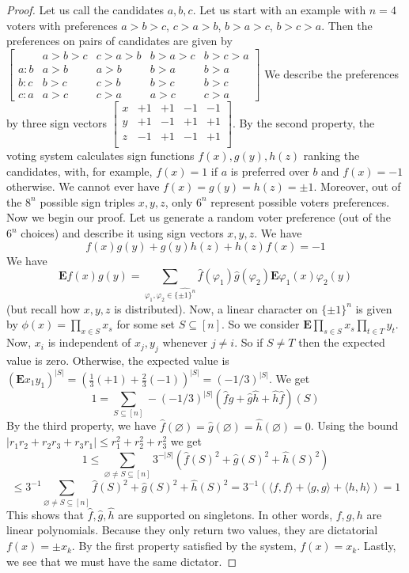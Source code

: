 \documentclass[12pt]{article}
\newcommand{\abs}[1]{\left\lvert#1\right\rvert}
\newcommand{\gen}[1]{\langle#1\rangle}
\newcommand{\vphi}{\varphi}
\newcommand{\E}{\mathbf{E}}
\begin{document}
\begin{proof}
Let us call the candidates $a,b,c$. Let us start with an example with $n=4$ voters with preferences $a>b>c$, $c>a>b$, $b>a>c$, $b>c>a$. Then the preferences on pairs of candidates are given by
$\begin{bmatrix}
    & a>b>c & c>a>b & b>a>c & b>c>a\\
a:b & a>b   & a>b   & b>a   & b>a\\
b:c & b>c   & c>b   & b>c   & b>c\\
c:a & a>c   & c>a   & a>c   & c>a
\end{bmatrix}$
We describe the preferences by three sign vectors
$\begin{bmatrix}
    x & +1 & +1 & -1 & -1\\
    y & +1 & -1 & +1 & +1\\
    z & -1 & +1 & -1 & +1\\
\end{bmatrix}$.
By the second property, the voting system calculates sign functions $f(x),g(y),h(z)$ ranking the candidates, with, for example, $f(x)=1$ if $a$ is preferred over $b$ and $f(x)=-1$ otherwise. 
We cannot ever have $f(x)=g(y)=h(z)=\pm1$. Moreover, out of the $8^n$ possible sign triples $x,y,z$, only $6^n$ represent possible voters preferences. Now we begin our proof. Let us generate a random voter preference (out of the $6^n$ choices) and describe it using sign vectors $x,y,z$. We have 
\[f(x)g(y)+g(y)h(z)+h(z)f(x) = -1\]
We have
\[\E f(x)g(y) = \sum_{\vphi_1,\vphi_2\in\widehat{\{\pm1\}^n}}\hat{f}(\vphi_1)\hat{g}(\vphi_2)\E \vphi_1(x)\vphi_2(y)\]
(but recall how $x,y,z$ is distributed).
Now, a linear character on $\{\pm1\}^n$ is given by $\phi(x) = \prod_{x\in S}x_s$ for some set $S\subseteq[n]$. So we consider $\E \prod_{s\in S}x_s \prod_{t\in T}y_t$. Now, $x_i$ is independent of $x_j,y_j$ whenever $j\neq i$. So if $S\neq T$ then the expected value is zero. Otherwise, the expected value is $\left(\E x_1y_1\right)^{\abs{S}} = \left(\frac{1}{3}(+1) + \frac{2}{3}(-1)\right)^{\abs{S}} = (-1/3)^{\abs{S}}$.
We get
\[1 = \sum_{S\subseteq [n]} -(-1/3)^{\abs{S}} (\hat{f}\hat{g}+\hat{g}\hat{h} +\hat{h}\hat{f})(S)\]
By the third property, we have $\hat{f}(\varnothing)=\hat{g}(\varnothing)=\hat{h}(\varnothing)=0$. Using the bound $\abs{r_1r_2+r_2r_3+r_3r_1}\le r_1^2+r_2^2+r_3^2$ we get
\[1 
\le \sum_{\varnothing\neq S\subseteq [n]}3^{-\abs{S}}\left(\hat{f}(S)^2 + \hat{g}(S)^2 + \hat{h}(S)^2 \right)\]
\[\le 3^{-1}\sum_{\varnothing\neq S\subseteq [n]}\hat{f}(S)^2 + \hat{g}(S)^2 + \hat{h}(S)^2 = 3^{-1}\left(\gen{f,f}+\gen{g,g}+\gen{h,h}\right)=1\]
This shows that $\hat{f},\hat{g},\hat{h}$ are supported on singletons. In other words, $f,g,h$ are linear polynomials. Because they only return two values, they are dictatorial $f(x)=\pm x_k$. By the first property satisfied by the system, $f(x)=x_k$. Lastly, we see that we must have the same dictator.
\end{proof}
\end{document}
